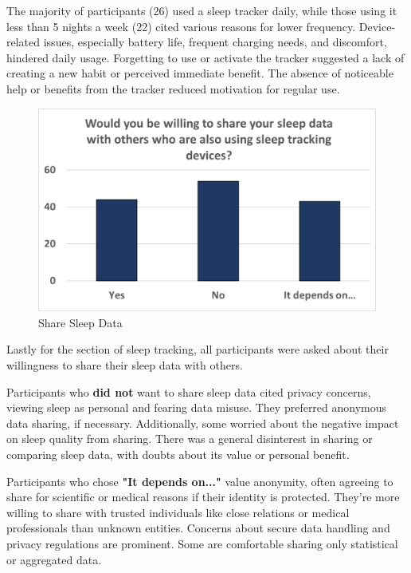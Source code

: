 \documentclass[
  a4paper,  %
  twoside,  %
  bibliography=totoc,
  headsepline,
  cleardoublepage=empty,
  parskip=half,
  draft=false
]{scrbook}
\begin{document}
The majority of participants (26) used a sleep tracker daily, while those using it less than 5 nights a week (22) cited various reasons for lower frequency. Device-related issues, especially battery life, frequent charging needs, and discomfort, hindered daily usage. Forgetting to use or activate the tracker suggested a lack of creating a new habit or perceived immediate benefit. The absence of noticeable help or benefits from the tracker reduced motivation for regular use.

\begin{figure}[H]
    \centering
    \includegraphics[scale=0.8]{graphics/Share_Data.png}
    \caption{Share Sleep Data}
    \label{fig:share}
\end{figure}

Lastly for the section of sleep tracking, all participants were asked about their willingness to share their sleep data with others. 

Participants who \textbf{did not} want to share sleep data cited privacy concerns, viewing sleep as personal and fearing data misuse. They preferred anonymous data sharing, if necessary.  Additionally, some worried about the negative impact on sleep quality from sharing. There was a general disinterest in sharing or comparing sleep data, with doubts about its value or personal benefit.

Participants who chose \textbf{"It depends on..."} value anonymity, often agreeing to share for scientific or medical reasons if their identity is protected. They're more willing to share with trusted individuals like close relations or medical professionals than unknown entities. Concerns about secure data handling and privacy regulations are prominent. Some are comfortable sharing only statistical or aggregated data.
\end{document}
